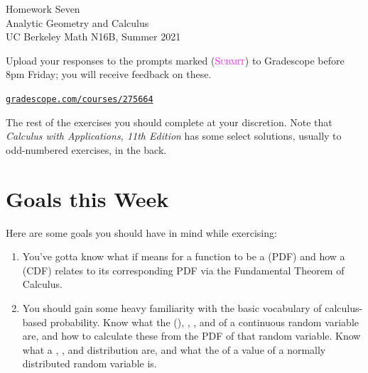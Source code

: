 

\usepackage{fourier}



\pagestyle{empty}




\begin{center}
    {\Huge{Homework Seven}}
    \\ \footnotesize{Analytic Geometry and Calculus}
    \\ \footnotesize{UC Berkeley Math N16B, Summer 2021}
\end{center}
\vspace{2em}

Upload your responses to the prompts marked
(\textsc{\textcolor{magenta}{Submit}})
to Gradescope before 8pm Friday; 
you will receive feedback on these.
\begin{center}
    \href{https://www.gradescope.com/courses/275664}%
    {\texttt{gradescope.com/courses/275664}}
\end{center}
The rest of the exercises you should complete at your discretion.
Note that \emph{Calculus with Applications, 11th Edition} 
has some select solutions, usually to odd-numbered exercises, in the back.


\section*{Goals this Week}

Here are some goals you should have in mind while exercising:
\begin{enumerate}
    \item 
        You've gotta know what if means for a function to be a 
         (PDF) 
        and how a  (CDF)
        relates to its corresponding PDF via the Fundamental Theorem of Calculus. 

    \item 
        You should gain some heavy familiarity with the basic vocabulary
        of calculus-based probability.
        Know what the  (), ,
        , and  
        of a continuous random variable are,
        and how to calculate these from the PDF of that random variable.
        Know what a , , 
        and  distribution are, 
        and what the  of a value of a normally distributed
        random variable is.

\end{enumerate}


